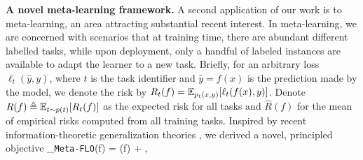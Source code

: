 \documentclass{article}
\theoremstyle{plain}
\theoremstyle{definition}
\theoremstyle{remark}
\newcommand{\FLO}{\texttt{FLO}}
\renewcommand{\CD}{\mathcal{D}}
\begin{document}
		
		
		
		{\bf A novel meta-learning framework.} A second application of our work is to meta-learning, an area attracting substantial recent interest. %
		In meta-learning, we are concerned with scenarios that at training time, there are abundant different labelled tasks, while upon deployment, only a handful of labeled instances are available to adapt the learner to a new task. Briefly, for an arbitrary loss $\ell_t(\hat{y}, y)$, where $t$ is the task identifier and $\hat{y}= f(x)$ is the prediction made by the model, we denote the risk by $R_t(f) = \mathbb{E}_{p_t(x,y)}[\ell_t(f(x), y)]$. Denote $R(f)\triangleq \mathbb{E}_{t\sim p(t)}[R_t(f)]$ as the expected risk for all tasks and $\hat{R}(f)$ for the mean of empirical risks computed from all training tasks. Inspired by recent information-theoretic generalization theories \citep{xu2017information}, we derived a novel, principled objective 
		\vspace{-3pt}
		\beq
		\CL_\texttt{Meta-FLO}(f) = (f) + \lambda \sqrt{I_{\FLO}(\hat{\CD}_t;\hat{E}_t)}, 
		\eeq
		
\end{document}
